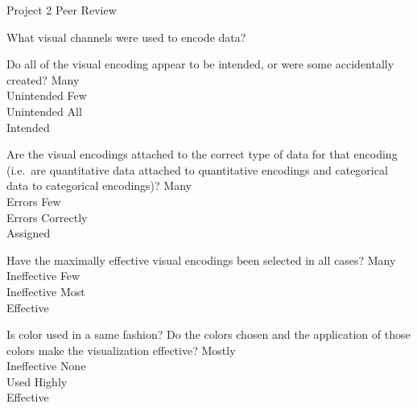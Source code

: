\documentclass[a4paper,12pt]{article}
\begin{document}
\newpage


\begin{center}
{\huge Project 2 Peer Review}
\end{center}





	{What visual channels were used to encode data? }
    { 
    }
        
	{Do all of the visual encoding appear to be intended, or were some accidentally created?}
        {\choice Many\\Unintended}
        {\choice Few\\Unintended}
        {\choice All\\Intended} 
        
	{Are the visual encodings attached to the correct type of data for that 
    	encoding (i.e.\ are quantitative data attached to quantitative 
        encodings and categorical data to categorical encodings)?}
    {\choice Many\\Errors}
    {\choice Few\\Errors}
    {\choice Correctly\\Assigned} 
            
	{Have the maximally effective visual encodings been selected in all cases? }
    {\choice Many\\Ineffective}
    {\choice Few\\Ineffective}
    {\choice Most\\Effective} 
        
	{Is color used in a same fashion? Do the colors chosen and the application 
    	of those colors make the visualization effective?}
    {\choice Mostly\\Ineffective}
    {\choice None\\Used}
    {\choice Highly\\Effective} 
\end{document}
